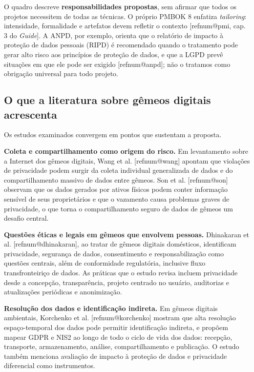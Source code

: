 \documentclass[12pt,a4paper,article,oneside,english,brazil]{abntex2}
\makeatletter
\newcommand{\refnum}[1]{\csname refnum@#1\endcsname}
\makeatother
\begin{document}
O quadro descreve \textbf{responsabilidades propostas}, sem afirmar que todos os projetos necessitem de todas as técnicas. O próprio PMBOK 8 enfatiza \textit{tailoring}: intensidade, formalidade e artefatos devem refletir o contexto [\refnum{pmi}, cap. 3 do \textit{Guide}]. A ANPD, por exemplo, orienta que o relatório de impacto à proteção de dados pessoais (RIPD) é recomendado quando o tratamento pode gerar alto risco aos princípios de proteção de dados, e que a LGPD prevê situações em que ele pode ser exigido [\refnum{anpd}]; não o tratamos como obrigação universal para todo projeto.
\subsection{O que a literatura sobre gêmeos digitais acrescenta}

Os estudos examinados convergem em pontos que sustentam a proposta.

\textbf{Coleta e compartilhamento como origem do risco.} Em levantamento sobre a Internet dos gêmeos digitais, Wang et al. [\refnum{wang}] apontam que violações de privacidade podem surgir da coleta individual generalizada de dados e do compartilhamento massivo de dados entre gêmeos. Son et al. [\refnum{son}] observam que os dados gerados por ativos físicos podem conter informação sensível de seus proprietários e que o vazamento causa problemas graves de privacidade, o que torna o compartilhamento seguro de dados de gêmeos um desafio central.

\textbf{Questões éticas e legais em gêmeos que envolvem pessoas.} Dhinakaran et al. [\refnum{dhinakaran}], ao tratar de gêmeos digitais domésticos, identificam privacidade, segurança de dados, consentimento e responsabilização como questões centrais, além de conformidade regulatória, inclusive fluxo transfronteiriço de dados. As práticas que o estudo revisa incluem privacidade desde a concepção, transparência, projeto centrado no usuário, auditorias e atualizações periódicas e anonimização.

\textbf{Resolução dos dados e identificação indireta.} Em gêmeos digitais ambientais, Korchenko et al. [\refnum{korchenko}] mostram que alta resolução espaço-temporal dos dados pode permitir identificação indireta, e propõem mapear GDPR e NIS2 ao longo de todo o ciclo de vida dos dados: recepção, transporte, armazenamento, análise, compartilhamento e publicação. O estudo também menciona avaliação de impacto à proteção de dados e privacidade diferencial como instrumentos.
\end{document}
